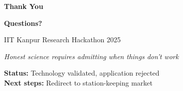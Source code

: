 \documentclass[aspectratio=169]{beamer}
\begin{document}
\begin{frame}
\begin{center}
\Huge\textbf{Thank You}

\vspace{2em}

\Large\textbf{Questions?}

\vspace{2em}

\normalsize
IIT Kanpur Research Hackathon 2025

\vspace{1em}

\textit{Honest science requires admitting when things don't work}

\vspace{1em}

\textbf{Status:} Technology validated, application rejected\\
\textbf{Next steps:} Redirect to station-keeping market
\end{center}
\end{frame}
\end{document}

